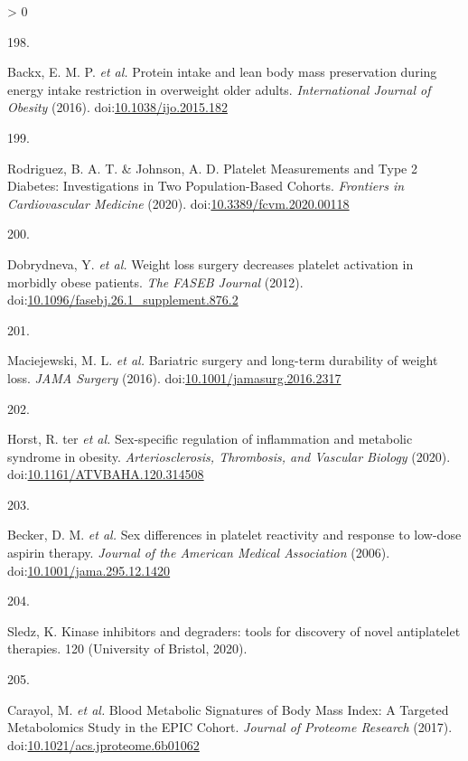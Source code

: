 \documentclass[11pt,twoside]{bristolthesis}
\newlength{\cslhangindent}
\newlength{\csllabelwidth}
\newenvironment{CSLReferences}[2] %
 {%
  \setlength{\parindent}{0pt}
  \ifodd #1 \everypar{\setlength{\hangindent}{\cslhangindent}}\ignorespaces\fi
  \ifnum #2 > 0
  \setlength{\parskip}{#2\baselineskip}
  \fi
 }%
 {}
\newcommand{\CSLLeftMargin}[1]{\parbox[t]{\csllabelwidth}{#1}}
\newcommand{\CSLRightInline}[1]{\parbox[t]{\linewidth - \csllabelwidth}{#1}\break}
\begin{document}
\begin{CSLReferences}{0}{0}
\leavevmode\hypertarget{ref-Backx2016}{}%
\CSLLeftMargin{198. }
\CSLRightInline{Backx, E. M. P. \emph{et al.} {Protein intake and lean body mass preservation during energy intake restriction in overweight older adults}. \emph{International Journal of Obesity} (2016). doi:\href{https://doi.org/10.1038/ijo.2015.182}{10.1038/ijo.2015.182}}

\leavevmode\hypertarget{ref-Rodriguez2020}{}%
\CSLLeftMargin{199. }
\CSLRightInline{Rodriguez, B. A. T. \& Johnson, A. D. {Platelet Measurements and Type 2 Diabetes: Investigations in Two Population-Based Cohorts}. \emph{Frontiers in Cardiovascular Medicine} (2020). doi:\href{https://doi.org/10.3389/fcvm.2020.00118}{10.3389/fcvm.2020.00118}}

\leavevmode\hypertarget{ref-Dobrydneva2012}{}%
\CSLLeftMargin{200. }
\CSLRightInline{Dobrydneva, Y. \emph{et al.} {Weight loss surgery decreases platelet activation in morbidly obese patients}. \emph{The FASEB Journal} (2012). doi:\href{https://doi.org/10.1096/fasebj.26.1_supplement.876.2}{10.1096/fasebj.26.1\_supplement.876.2}}

\leavevmode\hypertarget{ref-Maciejewski2016}{}%
\CSLLeftMargin{201. }
\CSLRightInline{Maciejewski, M. L. \emph{et al.} {Bariatric surgery and long-term durability of weight loss}. \emph{JAMA Surgery} (2016). doi:\href{https://doi.org/10.1001/jamasurg.2016.2317}{10.1001/jamasurg.2016.2317}}

\leavevmode\hypertarget{ref-TerHorst2020}{}%
\CSLLeftMargin{202. }
\CSLRightInline{Horst, R. ter \emph{et al.} {Sex-specific regulation of inflammation and metabolic syndrome in obesity}. \emph{Arteriosclerosis, Thrombosis, and Vascular Biology} (2020). doi:\href{https://doi.org/10.1161/ATVBAHA.120.314508}{10.1161/ATVBAHA.120.314508}}

\leavevmode\hypertarget{ref-Becker2006}{}%
\CSLLeftMargin{203. }
\CSLRightInline{Becker, D. M. \emph{et al.} {Sex differences in platelet reactivity and response to low-dose aspirin therapy}. \emph{Journal of the American Medical Association} (2006). doi:\href{https://doi.org/10.1001/jama.295.12.1420}{10.1001/jama.295.12.1420}}

\leavevmode\hypertarget{ref-Sledz2020}{}%
\CSLLeftMargin{204. }
\CSLRightInline{Sledz, K. {Kinase inhibitors and degraders: tools for discovery of novel antiplatelet therapies}. 120 (University of Bristol, 2020).}

\leavevmode\hypertarget{ref-Carayol2017c}{}%
\CSLLeftMargin{205. }
\CSLRightInline{Carayol, M. \emph{et al.} {Blood Metabolic Signatures of Body Mass Index: A Targeted Metabolomics Study in the EPIC Cohort}. \emph{Journal of Proteome Research} (2017). doi:\href{https://doi.org/10.1021/acs.jproteome.6b01062}{10.1021/acs.jproteome.6b01062}}


\end{CSLReferences}
\end{document}
